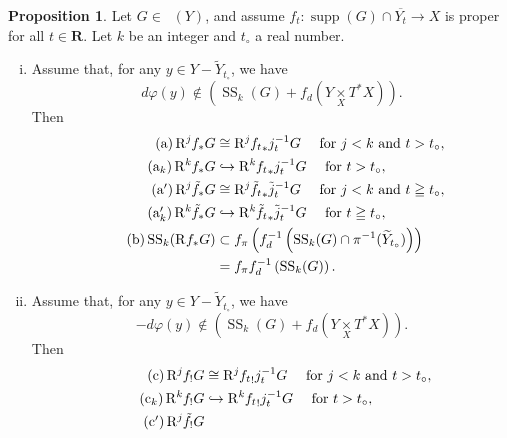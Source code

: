 ﻿\documentclass[a4paper,leqno]{jsarticle}
\theoremstyle{definition}
\newtheorem{Proposition+}[Axiom+]{Proposition}
\newcommand{\rr}{\mathbf{R}}
\numberwithin{equation}{section}
\newcommand{\supp}{\mathop{\mathrm{supp}}\nolimits}
\newcommand{\Dompb}{\mathop{\mathsf{D}^\mathrm{b}}\nolimits}
\newcommand{\muS}[1][]{\mathop{\mathrm{SS}}\nolimits_{#1}}
\newcommand{\Rder}[1][]{\mathop{\mathrm{R}^{#1}\hspace{-2pt}}\nolimits}
\newcommand{\pb}[1][]{\mathbin{\mathop{\times}\limits_{#1}}}
\theoremstyle{mystyle}
\newcommand{\mpb}[1][]{{#1}_{\pi}} %
\newcommand{\mdiff}[1][]{{#1}_{d}} %
\newcommand{\cotb}[1][]{T^{\ast}{#1}}
\newcommand{\smi}{-}
\begin{document}
\begin{Proposition+}
  Let \(G\in\Dompb(Y)\), and assume \(
    f_{t}\colon \supp(G)\cap \overline{Y_t}\to X
  \) is proper for all \(t\in\rr\). 
  Let \(k\) be an integer and \(t_\circ\) a real number.
  \begin{enumerate}[(i)]
    \item Assume that, 
    for any \(y\in Y\smi \widetilde{Y}_{t_{\circ}}\), 
    we have \[
      d\varphi(y)\notin \left(
        \muS[k](G)+ \mdiff[f]\left(
          Y\pb[X]\cotb[X]
        \right)
      \right).
    \]
    Then \begin{align}
      \tag{a}
      \Rder[j]{f_{\ast}}G
      &\cong
      \Rder[j]{{f_{t}}_{\ast}}j^{-1}_{t}G
      \quad
      \text{ for \(j<k\) and \(t>t_\circ\)},\\
      \tag{a\(_k\)}
      \Rder[k]{f_{\ast}}G
      &\hookrightarrow
      \Rder[k]{{f_{t}}_{\ast}}j^{-1}_{t}G
      \quad
      \text{ for \(t>t_\circ\)},\\
      \tag{a\('\)}
      \Rder[j]{\tilde{f}_{\ast}}G
      &\cong
      \Rder[j]\tilde{f_{t}}_{\ast}\tilde{j}^{-1}_{t}G
      \quad
      \text{ for \(j<k\) and \(t\geqq t_\circ\)},\\
      \tag{a\(_k'\)}
      \Rder[k]{\tilde{f}_{\ast}}G
      &\hookrightarrow
      \Rder[k]\tilde{f_{t}}_{\ast}\tilde{j}^{-1}_{t}G
      \quad
      \text{ for \(t\geqq t_\circ\)},\\
      \tag{b}
      \muS[k](\Rder[]{f_{\ast}}G)
      &\subset
      \mpb[f]\left(\mdiff[f]^{-1}\left(
        \muS[k](G)\cap \pi^{-1}(\widetilde{Y}_{t_{\circ}})
      \right)\right)\\
      \notag&=\mpb[f]\mdiff[f]^{-1}\left(
        \muS[k](G)
      \right).
    \end{align}
    \item Assume that, 
    for any \(y\in Y\smi \widetilde{Y}_{t_{\circ}}\), 
    we have \[
      -d\varphi(y)\notin \left(
        \muS[k](G)+ \mdiff[f]\left(
          Y\pb[X]\cotb[X]
        \right)
      \right).
    \]
    Then \begin{align}
      \tag{c}
      \Rder[j]{f_{!}}G
      &\cong
      \Rder[j]{{f_{t}}_{!}}j^{-1}_{t}G
      \quad
      \text{ for \(j<k\) and \(t>t_\circ\)},\\
      \tag{c\(_k\)}
      \Rder[k]{f_{!}}G
      &\hookrightarrow
      \Rder[k]{{f_{t}}_{!}}j^{-1}_{t}G
      \quad
      \text{ for \(t>t_\circ\)},\\
      \tag{c\('\)}
      \Rder[j]{\tilde{f}_{!}}G

\end{align}
\end{enumerate}
\end{Proposition+}
\end{document}
